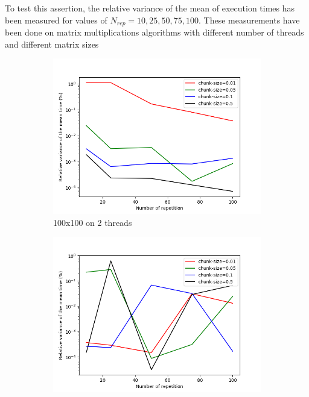 \documentclass[12pt]{article}
\begin{document}
To test this assertion, the relative variance of the mean of execution times has been measured for values of $N_{rep}=10,25,50,75,100$. These measurements have been done on matrix multiplications algorithms with different number of threads and different matrix sizes
\begin{figure}
	\centering
	\begin{subfigure}[b]{0.475\textwidth}
		\centering
		\includegraphics[width=\textwidth]{rel_var_100_2.png}
		\caption[Network2]%
		{{\small 100x100 on 2 threads}}    
	\end{subfigure}
	\hfill
	\begin{subfigure}[b]{0.475\textwidth}  
		\centering 
		\includegraphics[width=\textwidth]{rel_var_500_2.png}

\end{subfigure}
\end{figure}
\end{document}
